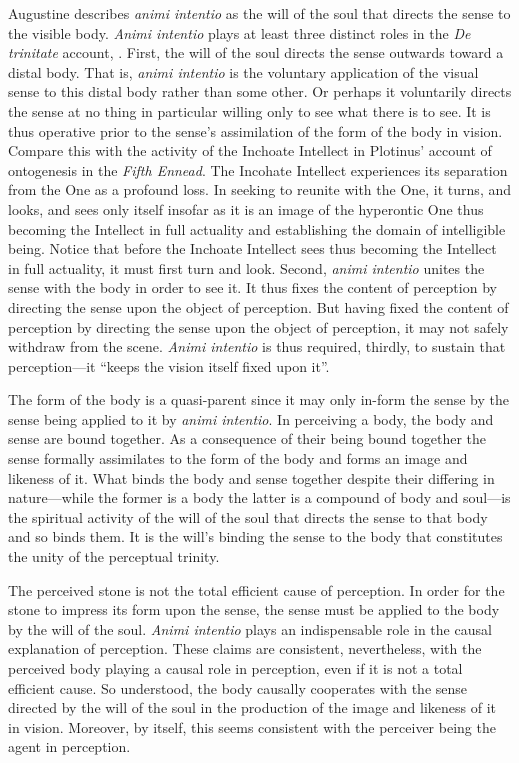 \documentclass[12pt]{article}
\begin{document}
Augustine describes \emph{animi intentio} as the will of the soul that directs the sense to the visible body. \emph{Animi intentio} plays at least three distinct roles in the \emph{De trinitate} account, \citep[81--82]{Silva:2014bh}. First, the will of the soul directs the sense outwards toward a distal body. That is, \emph{animi intentio} is the voluntary application of the visual sense to this distal body rather than some other. Or perhaps it voluntarily directs the sense at no thing in particular willing only to see what there is to see. It is thus operative prior to the sense's assimilation of the form of the body in vision. Compare this with the activity of the Inchoate Intellect in Plotinus' account of ontogenesis in the \emph{Fifth Ennead}. The Incohate Intellect experiences its separation from the One as a profound loss. In seeking to reunite with the One, it turns, and looks, and sees only itself insofar as it is an image of the hyperontic One thus becoming the Intellect in full actuality and establishing the domain of intelligible being. Notice that before the Inchoate Intellect sees thus becoming the Intellect in full actuality, it must first turn and look. Second, \emph{animi intentio} unites the sense with the body in order to see it. It thus fixes the content of perception by directing the sense upon the object of perception. But having fixed the content of perception by directing the sense upon the object of perception, it may not safely withdraw from the scene. \emph{Animi intentio} is thus required, thirdly, to sustain that perception---it ``keeps the vision itself fixed upon it''. 

The form of the body is a quasi-parent since it may only in-form the sense by the sense being applied to it by \emph{animi intentio}. In perceiving a body, the body and sense are bound together. As a consequence of their being bound together the sense formally assimilates to the form of the body and forms an image and likeness of it. What binds the body and sense together despite their differing in nature---while the former is a body the latter is a compound of body and soul---is the spiritual activity of the will of the soul that directs the sense to that body and so binds them. It is the will's binding the sense to the body that constitutes the unity of the perceptual trinity.

The perceived stone is not the total efficient cause of perception. In order for the stone to impress its form upon the sense, the sense must be applied to the body by the will of the soul. \emph{Animi intentio} plays an indispensable role in the causal explanation of perception. These claims are consistent, nevertheless, with the perceived body playing a causal role in perception, even if it is not a total efficient cause. So understood, the body causally cooperates with the sense directed by the will of the soul in the production of the image and likeness of it in vision. Moreover, by itself, this seems consistent with the perceiver being the agent in perception. 
\end{document}
